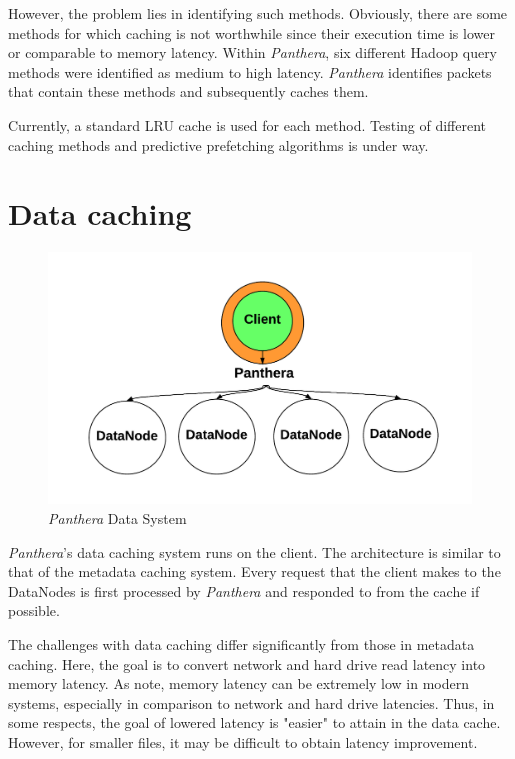 \documentclass[12pt]{article}
\begin{document}
However, the problem lies in identifying such methods. Obviously, there are some methods for which caching is not worthwhile since their execution time is lower or comparable to memory latency. Within \textit{Panthera}, six different Hadoop query methods were identified as medium to high latency. \textit{Panthera} identifies packets that contain these methods and subsequently caches them.

Currently, a standard LRU cache \cite{cache} is used for each method. Testing of different caching methods and predictive prefetching algorithms is under way.

\section{Data caching}

\begin{figure}[!h]
	\caption{\textit{Panthera} Data System}
	\centering
		\includegraphics[scale=0.4]{assets/panthera_data_architecture.pdf}
\end{figure}

\textit{Panthera}'s data caching system runs on the client. The architecture is similar to that of the metadata caching system. Every request that the client makes to the DataNodes is first processed by \textit{Panthera} and responded to from the cache if possible. 

The challenges with data caching differ significantly from those in metadata caching. Here, the goal is to convert network and hard drive read latency into memory latency. As \cite{ramcloud, hadoop} note, memory latency can be extremely low in modern systems, especially in comparison to network and hard drive latencies. Thus, in some respects, the goal of lowered latency is "easier" to attain in the data cache. However, for smaller files, it may be difficult to obtain latency improvement.
\end{document}
